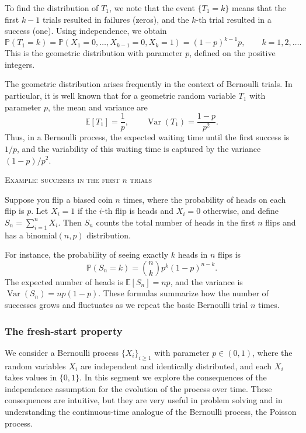 To find the distribution of \(T_1\), we note that the event \(\{T_1 = k\}\) means that the first \(k-1\) trials resulted in failures (zeros), and the \(k\)-th trial resulted in a success (one).  
Using independence, we obtain
\[
\mathbb{P}(T_1 = k)
=
\mathbb{P}(X_1 = 0, \ldots, X_{k-1} = 0, X_k = 1)
=
(1-p)^{k-1} p,
\qquad
k = 1,2,\ldots.
\]
This is the geometric distribution with parameter \(p\), defined on the positive integers.  

The geometric distribution arises frequently in the context of Bernoulli trials.  
In particular, it is well known that for a geometric random variable \(T_1\) with parameter \(p\), the mean and variance are
\[
\mathbb{E}[T_1] = \frac{1}{p},
\qquad
\operatorname{Var}(T_1) = \frac{1-p}{p^{2}}.
\]
Thus, in a Bernoulli process, the expected waiting time until the first success is \(1/p\), and the variability of this waiting time is captured by the variance \((1-p)/p^{2}\).  

\bigskip
\textsc{Example: successes in the first \(n\) trials}

Suppose you flip a biased coin \(n\) times, where the probability of heads on each flip is \(p\).  
Let \(X_i = 1\) if the \(i\)-th flip is heads and \(X_i = 0\) otherwise, and define \(S_n = \sum_{i=1}^{n} X_i\).  
Then \(S_n\) counts the total number of heads in the first \(n\) flips and has a binomial\((n,p)\) distribution.  

For instance, the probability of seeing exactly \(k\) heads in \(n\) flips is
\[
\mathbb{P}(S_n = k) = \binom{n}{k} p^{k} (1-p)^{n-k}.
\]
The expected number of heads is \(\mathbb{E}[S_n] = np\), and the variance is \(\operatorname{Var}(S_n) = np(1-p)\).  
These formulas summarize how the number of successes grows and fluctuates as we repeat the basic Bernoulli trial \(n\) times.


\subsubsection{The fresh-start property}

We consider a Bernoulli process \(\{X_i\}_{i \geq 1}\) with parameter \(p \in (0,1)\), where the random variables \(X_i\) are independent and identically distributed, and each \(X_i\) takes values in \(\{0,1\}\).  
In this segment we explore the consequences of the independence assumption for the evolution of the process over time.  
These consequences are intuitive, but they are very useful in problem solving and in understanding the continuous-time analogue of the Bernoulli process, the Poisson process.  

